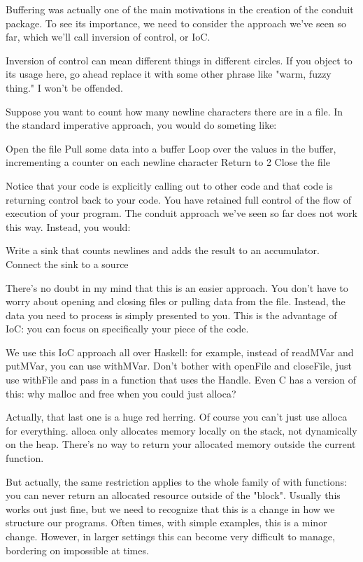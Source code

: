 Buffering was actually one of the main motivations in the creation of the
conduit package. To see its importance, we need to consider the approach we've
seen so far, which we'll call inversion of control, or IoC.

Inversion of control can mean different things in different circles. If you object to its
usage here, go ahead replace it with some other phrase like "warm, fuzzy thing." I won't
be
offended.

Suppose you want to count how many newline characters there are in a file. In the standard
imperative approach, you would do someting like:

  
   Open the file
   Pull some data into a buffer
   Loop over the values in the buffer, incrementing a counter on each newline character
   Return to 2
   Close the file
  
Notice that your code is explicitly calling out to other code and that code is returning
control back to your code. You have retained full control of the flow of execution of your
program. The conduit approach we've seen so far does not work this way. Instead, you
would:
  
Write a sink that counts newlines and adds the result to an accumulator.
Connect the sink to a source
  
There's no doubt in my mind that this is an easier approach. You don't have to worry about
opening and closing files or pulling data from the file. Instead, the data you need to
process is
simply presented to you. This is the advantage of IoC: you can focus on specifically your
piece
of the code.

We use this IoC approach all over Haskell: for example, instead of readMVar
and putMVar, you can use withMVar. Don't bother with
openFile and closeFile, just use withFile and
pass in a function that uses the Handle. Even C has a version of this: why
malloc and free when you could just alloca?

Actually, that last one is a huge red herring. Of course you can't just use
alloca for everything. alloca only allocates memory locally on
the stack, not dynamically on the heap. There's no way to return your allocated memory
outside
the current function.

But actually, the same restriction applies to the whole family of with
functions: you can never return an allocated resource outside of the "block". Usually this
works
out just fine, but we need to recognize that this is a change in how we structure our
programs. Often times, with simple examples, this is a minor change. However, in larger
settings
this can become very difficult to manage, bordering on impossible at times.

